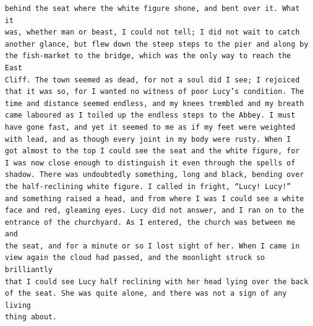 \documentclass{article}
\begin{document}
\begin{verbatim}
behind the seat where the white figure shone, and bent over it. What it
was, whether man or beast, I could not tell; I did not wait to catch
another glance, but flew down the steep steps to the pier and along by
the fish-market to the bridge, which was the only way to reach the East
Cliff. The town seemed as dead, for not a soul did I see; I rejoiced
that it was so, for I wanted no witness of poor Lucy’s condition. The
time and distance seemed endless, and my knees trembled and my breath
came laboured as I toiled up the endless steps to the Abbey. I must
have gone fast, and yet it seemed to me as if my feet were weighted
with lead, and as though every joint in my body were rusty. When I
got almost to the top I could see the seat and the white figure, for
I was now close enough to distinguish it even through the spells of
shadow. There was undoubtedly something, long and black, bending over
the half-reclining white figure. I called in fright, “Lucy! Lucy!”
and something raised a head, and from where I was I could see a white
face and red, gleaming eyes. Lucy did not answer, and I ran on to the
entrance of the churchyard. As I entered, the church was between me and
the seat, and for a minute or so I lost sight of her. When I came in
view again the cloud had passed, and the moonlight struck so brilliantly
that I could see Lucy half reclining with her head lying over the back
of the seat. She was quite alone, and there was not a sign of any living
thing about.


\end{verbatim}
\end{document}
